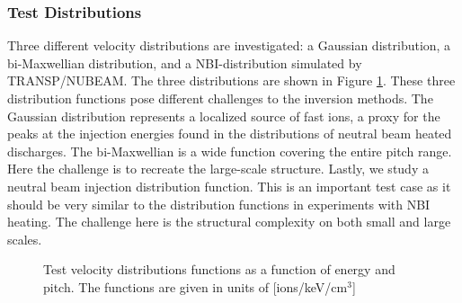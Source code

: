 \subsubsection{Test Distributions}
Three different velocity distributions are investigated: a Gaussian distribution, a bi-Maxwellian distribution, and a  NBI-distribution simulated by TRANSP/NUBEAM\cite{Pankin2004}. The three distributions are shown in Figure \ref{fig:original_distributions}. These three distribution functions pose different challenges to the inversion methods.
The Gaussian distribution represents a localized source of fast ions, a proxy for the peaks at the injection energies found in the distributions of neutral beam heated discharges. 
The bi-Maxwellian is a wide function covering the entire pitch range. Here the challenge is to recreate the large-scale structure. Lastly, we study a neutral beam injection distribution function. This is an important test case as it should be very similar to the distribution functions in experiments with NBI heating. The challenge here is the structural complexity on both small and large scales. 
\begin{figure}[h!]
    \centering
    \caption{Test velocity distributions functions as a function of energy and pitch. The functions are given in units of [ions/keV/cm$^3$]} \label{fig:original_distributions}
\end{figure}

